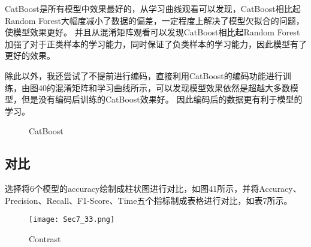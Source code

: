 \documentclass[../main.tex]{subfiles}
\begin{document}
        CatBoost是所有模型中效果最好的，从学习曲线观看可以发现，CatBoost相比起Random Forest大幅度减小了数据的偏差，一定程度上解决了模型欠拟合的问题，使模型效果更好。
        并且从混淆矩阵观看可以发现CatBoost相比起Random Forest加强了对于正类样本的学习能力，同时保证了负类样本的学习能力，因此模型有了更好的效果。

        除此以外，我还尝试了不提前进行编码，直接利用CatBoost的编码功能进行训练，由图40的混淆矩阵和学习曲线所示，可以发现模型效果依然是超越大多数模型，但是没有编码后训练的CatBoost效果好。
        因此编码后的数据更有利于模型的学习。

        \begin{figure}[H]
            \centering
            \caption{CatBoost}
        \end{figure}

    \subsection{对比}
    
        选择将6个模型的accuracy绘制成柱状图进行对比，如图41所示，并将Accuracy、Precision、Recall、F1-Score、Time五个指标制成表格进行对比，如表7所示。

        \begin{figure}[H]
            \centering
                \texttt{[image: Sec7\_33.png]}
            \caption{Contrast}
        \end{figure}
\end{document}
